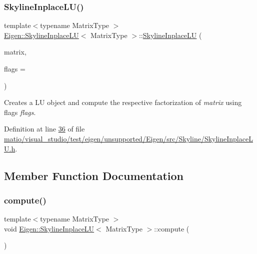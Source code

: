 \subsubsection{\texorpdfstring{Skyline\+Inplace\+L\+U()}{SkylineInplaceLU()}\hspace{0.1cm}{\footnotesize\ttfamily [2/2]}}
{\footnotesize\ttfamily template$<$typename Matrix\+Type $>$ \\
\hyperlink{class_eigen_1_1_skyline_inplace_l_u}{Eigen\+::\+Skyline\+Inplace\+LU}$<$ Matrix\+Type $>$\+::\hyperlink{class_eigen_1_1_skyline_inplace_l_u}{Skyline\+Inplace\+LU} (\begin{DoxyParamCaption}\item[{Matrix\+Type \&}]{matrix,  }\item[{int}]{flags = {} }\end{DoxyParamCaption})\hspace{0.3cm}{\ttfamily [inline]}}

Creates a LU object and compute the respective factorization of {\itshape matrix} using flags {\itshape flags}. 

Definition at line \hyperlink{matio_2visual__studio_2test_2eigen_2unsupported_2_eigen_2src_2_skyline_2_skyline_inplace_l_u_8h_source_l00036}{36} of file \hyperlink{matio_2visual__studio_2test_2eigen_2unsupported_2_eigen_2src_2_skyline_2_skyline_inplace_l_u_8h_source}{matio/visual\+\_\+studio/test/eigen/unsupported/\+Eigen/src/\+Skyline/\+Skyline\+Inplace\+L\+U.\+h}.



\subsection{Member Function Documentation}
\mbox{\label{class_eigen_1_1_skyline_inplace_l_u_a590e9a988b2843712a29a541787e6c38}} 
\subsubsection{\texorpdfstring{compute()}{compute()}\hspace{0.1cm}{\footnotesize\ttfamily [1/2]}}
{\footnotesize\ttfamily template$<$typename Matrix\+Type $>$ \\
void \hyperlink{class_eigen_1_1_skyline_inplace_l_u}{Eigen\+::\+Skyline\+Inplace\+LU}$<$ Matrix\+Type $>$\+::compute (\begin{DoxyParamCaption}{ }\end{DoxyParamCaption})}

